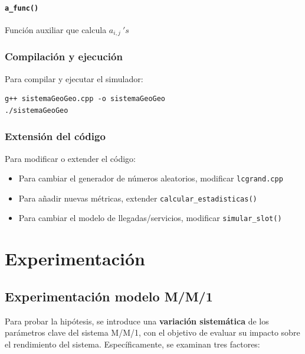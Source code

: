 \documentclass{article}
\begin{document}
\paragraph{\texttt{a\_func()}}
Función auxiliar que calcula $a_{i,j} \ 's$

\subsubsection{Compilación y ejecución}

Para compilar y ejecutar el simulador:

\begin{verbatim}
g++ sistemaGeoGeo.cpp -o sistemaGeoGeo 
./sistemaGeoGeo
\end{verbatim}

\subsubsection{Extensión del código}

Para modificar o extender el código:
\begin{itemize}
    \item Para cambiar el generador de números aleatorios, modificar \texttt{lcgrand.cpp}
    \item Para añadir nuevas métricas, extender \texttt{calcular\_estadisticas()}
    \item Para cambiar el modelo de llegadas/servicios, modificar \texttt{simular\_slot()}
\end{itemize}






\section{Experimentación}\label{sec:exp}

\subsection{Experimentación modelo M/M/1}

Para probar la hipótesis, se introduce una \textbf{variación sistemática} de los parámetros clave del sistema M/M/1, con el objetivo de evaluar su impacto sobre el rendimiento del sistema. Específicamente, se examinan tres factores:
\end{document}
